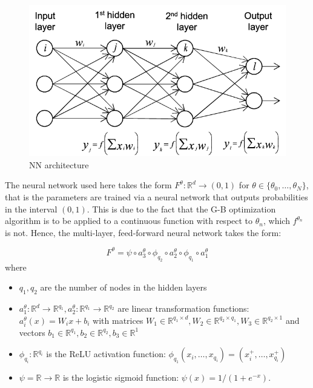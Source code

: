 \documentclass{article}
\begin{document}
\begin{figure}[H] 
	\centering
	\includegraphics[scale=0.4]{feed-forward_NN.png}
	\caption{NN architecture}
	\label{fig:diagram}
\end{figure}

The neural network used here takes the form $F^{\theta}: \mathbb{R}^d \rightarrow (0,1)$ for $\theta \in \{\theta_0, \ldots, \theta_N  \}$, that is the parameters are trained via a neural network that outputs probabilities in the interval $(0,1)$. This is due to the fact that the G-B optimization algorithm is to be applied to a continuous function with respect to $\theta_n$, which $f^{\theta_n}$ is not. Hence, the multi-layer, feed-forward neural network takes the form:

\begin{equation}
F^{\theta}= \psi \circ a_3^{\theta} \circ \phi_{q_2} \circ a_2^{\theta} \circ \phi_{q_1} \circ a_1^{\theta}
\end{equation}
where 
\begin{itemize}
    \item $q_1, q_2$ are the number of nodes in the hidden layers
    \item $a_1^{\theta} : \mathbb{R}^d \rightarrow \mathbb{R}^{q_1}, a_2^{\theta}: \mathbb{R}^{q_1} \rightarrow \mathbb{R}^{q_2}$ are linear transformation functions: $a_i^{\theta}(x)=W_i x + b_i$ with matrices $W_1 \in \mathbb{R}^{q_1 \times d}, W_2 \in \mathbb{R}^{q_2 \times q_1}, W_3 \in \mathbb{R}^{q_2 \times 1}$ and vectors $b_1 \in \mathbb{R}^{q_1}, b_2 \in \mathbb{R}^{q_2}, b_3 \in \mathbb{R}^{1}$
    \item $\phi_{q_i}: \mathbb{R}^{q_i}$ is the ReLU activation function: $\phi_{q_1}(x_i, \ldots, x_{q_i})=(x_i^{+}, \ldots, x_{q_i}^{+})$
    \item $\psi = \mathbb{R} \rightarrow \mathbb{R}$ is the logistic sigmoid function: $\psi(x)=1/(1+ e^{-x})$.
\end{itemize}
\end{document}
